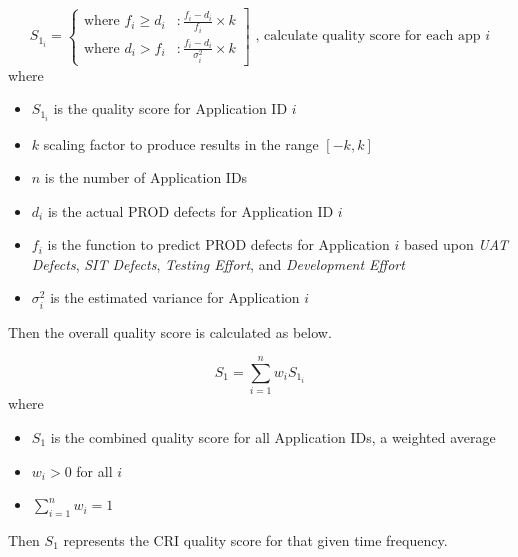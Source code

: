 \documentclass[SDSUThesis.tex]{subfiles}
\begin{document}
                \begin{displaymath}
                   S_{1_i} = \left\{
                     \begin{array}{lr}
                       \text{where } f_i \geq d_i & :  \frac{f_i - d_i}{f_i} \times k  \\
                       \text{where } d_i > f_i  & : \frac{f_i-d_i }{\sigma_i^2} \times k
                     \end{array}
                   \right] \text{   , calculate quality score for each app $i$}
                \end{displaymath} 
                where
                \begin{itemize}
                    \item $S_{1_i}$ is the quality score for Application ID $i$
                    \item $k$ scaling factor to produce results in the range $[-k,k]$
                    \item $n$ is the number of Application IDs
                    \item $d_i$ is the actual PROD defects for Application ID $i$
                    \item $f_i$ is the function to predict PROD defects for Application $i$ based upon 
                        \textit{UAT Defects}, \textit{SIT Defects}, \textit{Testing Effort}, 
                        and \textit{Development Effort}
                    \item $\sigma_i^2$ is the estimated variance for Application $i$
                \end{itemize}
                
                Then the overall quality score is calculated as below.
                
                \[
                    S_{1} = \sum\limits^n_{i=1} w_i S_{1_i}
                \]
                where
                \begin{itemize}
                    \item $S_1$ is the combined quality score for all Application IDs, 
                    a weighted average
                    \item $w_i > 0$ for all $i$
                    \item $\sum\limits^n_{i=1} w_i = 1$
                \end{itemize}
                
                Then $S_1$ represents the CRI quality score for that given time 
                frequency.
        
\end{document}
